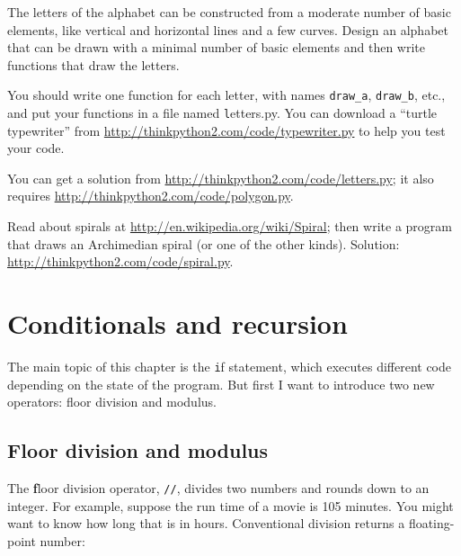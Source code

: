 \documentclass[
DIV=11,
fontsize=13,
twoside,
headinclude=false,
titlepage=firstiscover,
abstract=true,
headsepline=true,
footsepline=true,
chapterprefix=true, %
headings=big,
bibliography=totoc,%
captions=tableheading
]{scrbook}
\theoremstyle{definition}
\begin{document}
\begin{exercise}
\normalfont
{}

The letters of the alphabet can be constructed from a moderate number
of basic elements, like vertical and horizontal lines and a few
curves.  Design an alphabet that can be drawn with a minimal
number of basic elements and then write functions that draw the letters.

You should write one function for each letter, with names
\verb"draw_a", \verb"draw_b", etc., and put your functions
in a file named {\texttt letters.py}.  You can download a
``turtle typewriter'' from \url{http://thinkpython2.com/code/typewriter.py}
to help you test your code.

You can get a solution from \url{http://thinkpython2.com/code/letters.py};
it also requires
\url{http://thinkpython2.com/code/polygon.py}.

\end{exercise}

\begin{exercise}
\normalfont

Read about spirals at \url{http://en.wikipedia.org/wiki/Spiral}; then
write a program that draws an Archimedian spiral (or one of the other
kinds).  Solution: \url{http://thinkpython2.com/code/spiral.py}.

\end{exercise}


\chapter{Conditionals and recursion}

The main topic of this chapter is the {\texttt if} statement, which
executes different code depending on the state of the program.
But first I want to introduce two new operators: floor division
and modulus.


\section{Floor division and modulus}

The {\textbf floor division} operator, \verb"//", divides
two numbers and rounds down to an integer.  For example, suppose the
run time of a movie is 105 minutes.  You might want to know how
long that is in hours.  Conventional division
returns a floating-point number:
\end{document}
